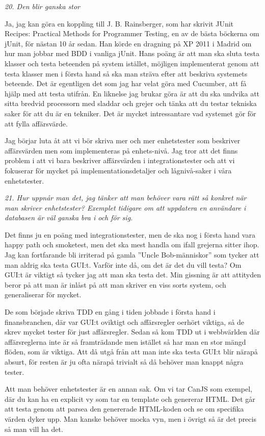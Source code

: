 \documentclass[11pt]{article}
\begin{document}
\emph{20. Den blir ganska stor}

Ja, jag kan göra en koppling till J. B. Rainsberger, som har skrivit JUnit Recipes: Practical Methods for Programmer Testing, en av de bästa böckerna om jUnit, för nästan 10 år sedan. Han körde en dragning på XP 2011 i Madrid om hur man jobbar med BDD i vanliga jUnit. Hans poäng är att man ska sluta testa klasser och testa beteenden på system istället, möjligen implementerat genom att testa klasser men i första hand så ska man sträva efter att beskriva systemets beteende. Det är egentligen det som jag har velat göra med Cucumber, att få hjälp med att testa utifrån. En liknelse jag brukar göra är att du ska undvika att sitta bredvid processorn med sladdar och grejer och tänka att du testar tekniska saker för att du är en tekniker. Det är mycket intressantare vad systemet gör för att fylla affärsvärde.

Jag börjar luta åt att vi bör skriva mer och mer enhetstester som beskriver affärsvärden men som implementeras på enhets-nivå. Jag tror att det finns problem i att vi bara beskriver affärsvärden i integrationstester och att vi fokuserar för mycket på implementationsdetaljer och lågnivå-saker i våra enhetstester.

\emph{21. Hur uppnår man det, jag tänker att man behöver vara rätt så konkret när man skriver enhetstester? Exemplet tidigare om att uppdatera en användare i databasen är väl ganska bra i och för sig.}

Det finns ju en poäng med integrationstester, men de ska nog i första hand vara happy path och smoketest, men det ska mest handla om ifall grejerna sitter ihop. Jag kan fortfarande bli irriterad på gamla ”Uncle Bob-människor” som tycker att man aldrig ska testa GUI:t. Varför inte då, om det är det du vill testa? Om GUI:t är viktigt så tycker jag att man ska testa det. Min gissning är att attityden beror på att man är inlåst på att man skriver en viss sorts system, och generaliserar för mycket.

De som började skriva TDD en gång i tiden jobbade i första hand i finansbranchen, där var GUI:t oviktigt och affärsregler oerhört viktiga, så de skrev mycket tester för just affärsregler. Sedan så kom TDD ut i webbvärlden där affärsreglerna inte är så framträdande men istället så har man en stor mängd flöden, som är viktiga. Att då utgå från att man inte ska testa GUI:t blir närapå absurt, för resten är ju ofta närapå trivialt så då behöver man knappt några tester.

Att man behöver enhetstester är en annan sak. Om vi tar CanJS som exempel, där du kan ha en explicit vy som tar en template och genererar HTML. Det går att testa genom att parsea den genererade HTML-koden och se om specifika värden dyker upp. Man kanske behöver mocka vyn, men i övrigt så är det precis så man vill ha det.
\end{document}

